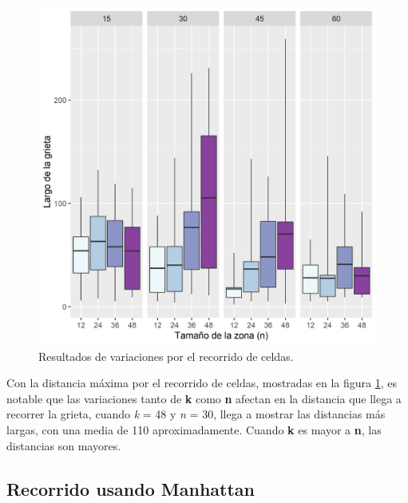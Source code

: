 \documentclass{article}
\begin{document}
\begin{figure}[h!]
\centering\includegraphics[width=120mm]{LargoDeGrieta.png}
\caption{Resultados de variaciones por el recorrido de celdas.}
\label{fig:Grieta}
\end{figure}

Con la distancia m\'axima por el recorrido de celdas, mostradas en la figura \ref{fig:Grieta}, es notable que las variaciones tanto de \textbf{k} como \textbf{n} afectan en la distancia que llega a recorrer la grieta, cuando \textit{k} = 48 y \textit{n} = 30, llega a mostrar las distancias m\'as largas, con una media de 110 aproximadamente. Cuando \textbf{k} es mayor a \textbf{n}, las distancias son mayores.

\newpage

\subsection{Recorrido usando Manhattan}
\end{document}
